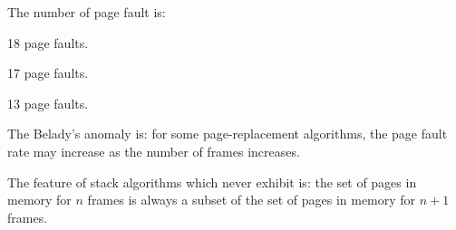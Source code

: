 \documentclass[11pt]{homework}
\begin{document}
\begin{table}[!htbp]
    \centering
    \caption{Optimal algorithm}
    \label{table:opt}
\end{table}

The number of page fault is:
\begin{description}[leftmargin = !, labelwidth = \widthof{\bfseries Optimal}, topsep = 0pt, itemsep = 0pt, parsep = 0pt]
    \item[LRU] 18 page faults.
    \item[FIFO] 17 page faults.
    \item[Optimal] 13 page faults.
\end{description}
\question
The Belady's anomaly is: for some page-replacement algorithms, the page fault rate may increase
as the number of frames increases.

The feature of stack algorithms which never exhibit is: the set of pages in memory for $n$ frames is
always a subset of the set of pages in memory for $n + 1$ frames.
\end{document}
